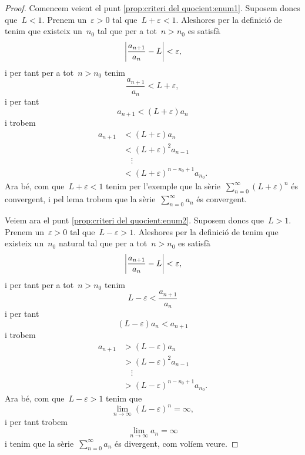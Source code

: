 \documentclass[../../main.tex]{subfiles}
\begin{document}
    \begin{proof}
        Comencem veient el punt \eqref{prop:criteri del quocient:enum1}.
        Suposem doncs que~\(L<1\).
        Prenem un~\(\varepsilon>0\) tal que~\(L+\varepsilon<1\).
        Aleshores per la definició de  tenim que existeix un~\(n_{0}\) tal que per a tot~\(n>n_{0}\) es satisfà
        \[
            \abs{\frac{a_{n+1}}{a_{n}}-L}<\varepsilon,
        \]
        i per tant per a tot~\(n>n_{0}\) tenim
        \[
            \frac{a_{n+1}}{a_{n}}<L+\varepsilon,
        \]
        i per tant
        \[
            a_{n+1}<(L+\varepsilon)a_{n}
        \]
        i trobem
        \begin{align*}
            a_{n+1}&<(L+\varepsilon)a_{n}\\
            &<(L+\varepsilon)^{2}a_{n-1}\\
            &\quad\vdots\\
            &<(L+\varepsilon)^{n-n_{0}+1}a_{n_{0}}.
        \end{align*}
        Ara bé, com que~\(L+\varepsilon<1\) tenim per l'exemple  que la sèrie~\(\sum_{n=0}^{\infty}(L+\varepsilon)^{n}\) és convergent, i pel lema  trobem que la sèrie~\(\sum_{n=0}^{\infty}a_{n}\) és convergent.

        Veiem ara el punt \eqref{prop:criteri del quocient:enum2}.
        Suposem doncs que~\(L>1\).
        Prenem un~\(\varepsilon>0\) tal que~\(L-\varepsilon>1\).
        Aleshores per la definició de  tenim que existeix un~\(n_{0}\) natural tal que per a tot~\(n>n_{0}\) es satisfà
        \[
            \abs{\frac{a_{n+1}}{a_{n}}-L}<\varepsilon,
        \]
        i per tant per a tot~\(n>n_{0}\) tenim
        \[
            L-\varepsilon<\frac{a_{n+1}}{a_{n}}
        \]
        i per tant
        \[
            (L-\varepsilon)a_{n}<a_{n+1}
        \]
        i trobem
        \begin{align*}
            a_{n+1}&>(L-\varepsilon)a_{n}\\
            &>(L-\varepsilon)^{2}a_{n-1}\\
            &\quad\vdots\\
            &>(L-\varepsilon)^{n-n_{0}+1}a_{n_{0}}.
        \end{align*}
        Ara bé, com que~\(L-\varepsilon>1\) tenim que
        \[
            \lim_{n\to\infty}(L-\varepsilon)^{n}=\infty,
        \]
        i per tant trobem
        \[
            \lim_{n\to\infty}a_{n}=\infty
        \]
        i tenim que la sèrie~\(\sum_{n=0}^{\infty}a_{n}\) és divergent, com volíem veure.
    \end{proof}
\end{document}
